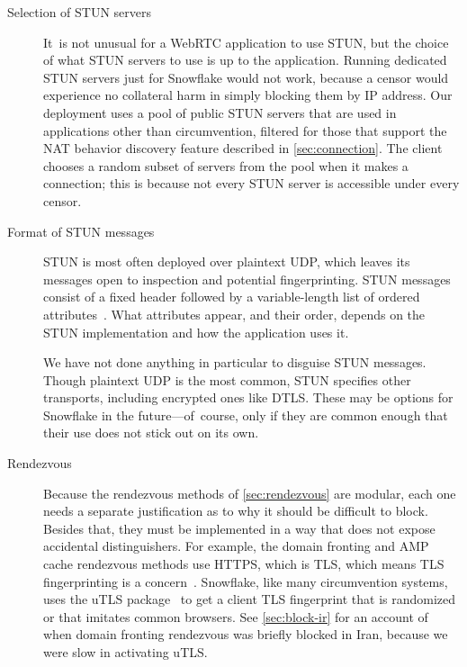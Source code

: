 \documentclass[letterpaper,twocolumn]{article}
\begin{document}
\begin{description}
\item[Selection of STUN servers]
It~is not unusual for a WebRTC application to use STUN,
but the choice of what STUN servers to use is up to the application.
Running dedicated STUN servers just for Snowflake would not work,
because a censor would experience no collateral harm in
simply blocking them by IP address.
Our deployment uses a pool of public STUN servers
that are used in applications other than circumvention,
filtered for those that support the NAT behavior discovery feature
described in \autoref{sec:connection}.
The client chooses a random subset of servers from the pool
when it makes a connection;
this is because not every STUN server is accessible
under every censor.

\item[Format of STUN messages]
STUN is most often deployed over plaintext UDP,
which leaves its messages open to inspection
and potential fingerprinting.
STUN messages consist of a fixed header
followed by a variable-length list of ordered
attributes~\cite[\S 5]{rfc8489}.
What attributes appear,
and their order,
depends on the STUN implementation
and how the application uses it.

We have not done anything in particular
to disguise STUN messages.
Though plaintext UDP is the most common,
STUN specifies other transports,
including encrypted ones like DTLS.
These may be options for Snowflake in the future---of~course,
only if they are common enough that their use
does not stick out on its own.

\item[Rendezvous]
Because the rendezvous methods of
\autoref{sec:rendezvous}
are modular,
each one needs a separate justification
as to why it should be difficult to block.
Besides that, they must be implemented in a way
that does not expose accidental distinguishers.
For example, the domain fronting and AMP cache rendezvous methods
use HTTPS, which is TLS,
which means TLS fingerprinting is a concern~\cite[\S 5.1]{Fifield2015a}.
Snowflake, like many circumvention systems,
uses the uTLS package~\cite[\S VII]{Frolov2019a}
to get a client TLS fingerprint that is randomized or that imitates common browsers.
See \autoref{sec:block-ir} for an account of when
domain fronting rendezvous was briefly blocked in Iran,
because we were slow in activating uTLS.


\end{description}
\end{document}
